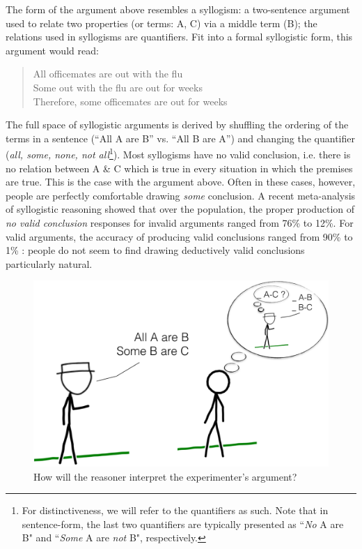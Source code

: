 \documentclass[10pt,letterpaper]{article}
\begin{document}
The form of the argument above resembles a syllogism: a two-sentence argument used to relate two properties (or terms: A, C) via a middle term (B); the relations used in syllogisms are quantifiers. Fit into a formal syllogistic form, this argument would read:
\begin{quote}
All officemates are out with the flu\\
Some out with the flu are out for weeks\\
Therefore, some officemates are out for weeks
\end{quote}
The full space of syllogistic arguments is derived by shuffling the ordering of the terms in a sentence (``All A are B'' vs. ``All B are A'') and changing the quantifier (\emph{all, some, none, not all}\footnote{For distinctiveness, we will refer to the quantifiers as such. Note that in sentence-form, the last two quantifiers are typically presented as ``\emph{No} A are B" and ``\emph{Some} A are \emph{not} B", respectively.}). Most syllogisms have no valid conclusion, i.e. there is no relation between A \& C which is true in every situation in which the premises are true. This is the case with the argument above. Often in these cases, however, people are perfectly comfortable drawing \emph{some} conclusion. A recent meta-analysis of syllogistic reasoning showed that over the population, the proper production of \emph{no valid conclusion} responses for invalid arguments ranged from 76\% to 12\%. For valid arguments, the accuracy of producing valid conclusions ranged from 90\% to 1\% \cite{Khemlani2012}: people do not seem to find drawing deductively valid conclusions particularly natural.
%
\begin{figure}
\centering
    \includegraphics[width=\columnwidth]{fig0_cartoon3}
    \caption{How will the reasoner interpret the experimenter's argument?}
  \label{fig:xkcd}
\end{figure}
\end{document}

